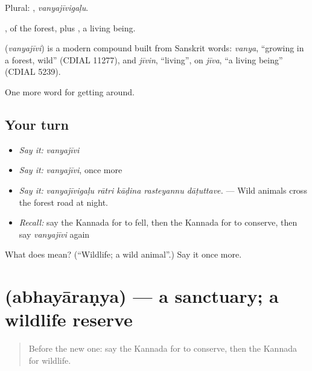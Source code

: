 Plural: , \emph{vanyajīvigaḷu}.

, of the forest, plus , a living being.

\begin{cousinweb}
\textbf{} (\emph{vanyajīvi}) is a modern compound built from Sanskrit words: \emph{vanya}, \textquotedblleft{}growing in a forest, wild\textquotedblright{} (CDIAL 11277), and \emph{jīvin}, \textquotedblleft{}living\textquotedblright{}, on \emph{jīva}, \textquotedblleft{}a living being\textquotedblright{} (CDIAL 5239).
\end{cousinweb}

\begin{grammarlens}[title={What you've built}]
One more word for getting around.
\end{grammarlens}

\subsection*{Your turn}
\begin{itemize}
\raggedright
  \item \emph{Say it:} \emph{vanyajīvi}
  \item \emph{Say it:} \emph{vanyajīvi}, once more
  \item \emph{Say it:} \emph{vanyajīvigaḷu rātri kāḍina rasteyannu dāṭuttave.} — Wild animals cross the forest road at night.
  \item \emph{Recall:} say the Kannada for to fell, then the Kannada for to conserve, then say \emph{vanyajīvi} again
\end{itemize}

\begin{tcolorbox}[breakable,colback=teal!4,colframe=teal!35!black,title={Before you move on}]
What does  mean? (\textquotedblleft{}Wildlife; a wild animal\textquotedblright{}.) Say it once more.
\end{tcolorbox}
\section[\texorpdfstring{\kn{ಅಭಯಾರಣ್ಯ} (abhayāraṇya)}{ಅಭಯಾರಣ್ಯ (abhayāraṇya)}]{ (abhayāraṇya) — a sanctuary; a wildlife reserve}

\label{lesson:KA-C476-abhayaranya}



\begin{quote}
Before the new one: say the Kannada for to conserve, then the Kannada for wildlife.
\end{quote}

